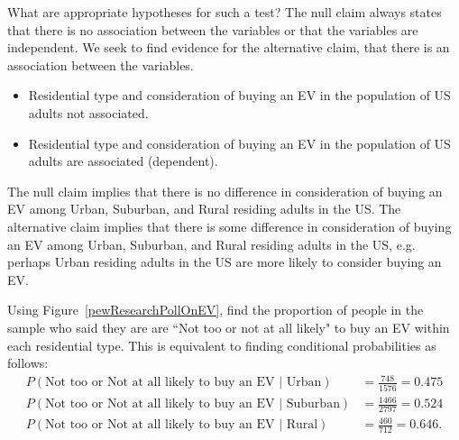 
\begin{examplewrap}
\begin{nexample}
{What are appropriate hypotheses for such a test?}\label{hypothesisTestSetupForPewResearchPollOnApprovalRatingsForChiSquareSection}
The null claim always states that there is no association between the variables or that the variables are independent.  We seek to find evidence for the alternative claim, that there is an association between the variables.
\begin{itemize}
\item[$H_0$:] Residential type and consideration of buying an EV in the population of US adults not associated.
\item[$H_A$:] Residential type and consideration of buying an EV in the population of US adults are associated (dependent). 
\end{itemize}
\end{nexample}
\end{examplewrap}


The null claim implies that there is no difference in consideration of buying an EV among Urban, Suburban, and Rural residing adults in the US.  The alternative claim implies that there is some difference in consideration of buying an EV among Urban, Suburban, and Rural residing adults in the US, e.g. perhaps Urban residing adults in the US are more likely to consider buying an EV.


\begin{examplewrap}
\begin{nexample}{Using Figure~\ref{pewResearchPollOnEV}, find the proportion of people in the sample who said they are are ``Not too or not at all likely" to buy an EV within each residential type.}
This is equivalent to finding conditional probabilities as follows:
\begin{align*}
P(\text{Not too or Not at all likely to buy an EV } | \text{ Urban}) &= \frac{748}{1576} = 0.475\\
P(\text{Not too or Not at all likely to buy an EV } | \text{ Suburban}) &= \frac{1466}{2797} = 0.524\\
P(\text{Not too or Not at all likely to buy an EV } | \text{ Rural}) &= \frac{460}{712} = 0.646.
\end{align*}
\end{nexample}
\end{examplewrap}

